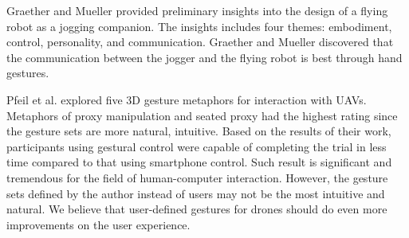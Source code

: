 \documentclass{sigchi}
\begin{document}
Graether and Mueller \cite{Graether:2012:JFR:2212776.2212386} provided preliminary insights into the design of a flying robot as a jogging companion. The insights includes four themes: embodiment, control, personality, and communication. Graether and Mueller discovered that the communication between the jogger and the flying robot is best through hand gestures.

Pfeil et al. \cite{Pfeil:2013:EGM:2449396.2449429} explored five 3D gesture metaphors for interaction with UAVs. Metaphors of proxy manipulation and seated proxy had the highest rating since the gesture sets are more natural, intuitive. Based on the results of their work, participants using gestural control were capable of completing the trial in less time compared to that using smartphone control. Such result is significant and tremendous for the field of human-computer interaction. However, the gesture sets defined by the author instead of users may not be the most intuitive and natural. We believe that user-defined gestures for drones should do even more improvements on the user experience.



\end{document}

